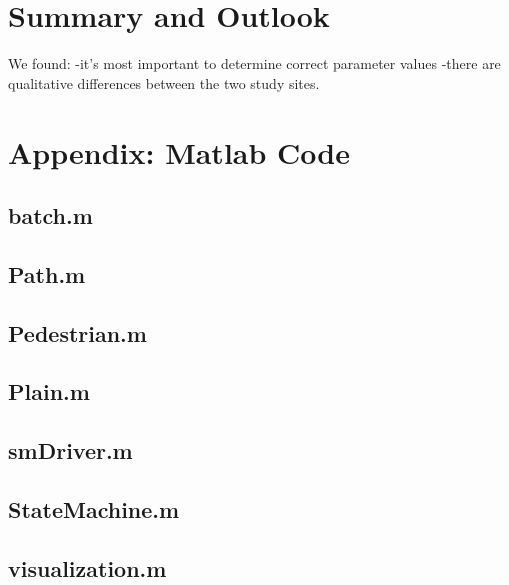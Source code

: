 \documentclass[a4paper, DIV11, abstracton]{scrartcl}
\begin{document}
\section{Summary and Outlook}
We found:
-it's most important to determine correct parameter values
-there are qualitative differences between the two study sites.

%
%

\renewcommand{\refname}{\section{References}} %




\newpage
\section{Appendix: Matlab Code}
\subsection*{batch.m}

\subsection*{Path.m}

\subsection*{Pedestrian.m}

\subsection*{Plain.m}

\subsection*{smDriver.m}

\subsection*{StateMachine.m}

\subsection*{visualization.m}

\end{document}
